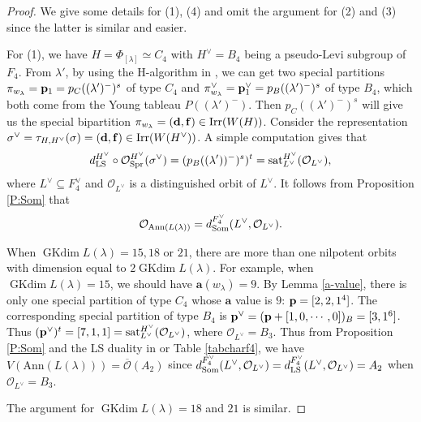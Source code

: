 \documentclass[reqno,12pt]{amsart}
\numberwithin{equation}{section}
\theoremstyle{plain}
\theoremstyle{definition}
\newcommand{\lam}{\lambda}
\newcommand{\Ann}{\mathrm{Ann}}
\renewcommand{\subset}{\subseteq}
\newcommand{\aff}{ \mathbf{a} }
\newcommand{\gkd}{\operatorname{GKdim}}
\begin{document}
\begin{proof}
We give some details for (1), (4) and omit the argument for  (2) and (3) since the latter is similar and easier.

For (1), we have
$H=\Phi_{[\lambda]}\simeq C_4$ with $H^\vee=B_4$ being a pseudo-Levi subgroup of $F_4$. From $\lam'$, by using the H-algorithm in \cite{BMW}, we can get two special partitions $\pi_{w_{\lam}}={\bf p}_{1}=p_C((\lam')^-)^s$ of type $C_4$ and  $\pi^{\vee}_{w_{\lam}}={\bf p}^{\vee}_{1}=p_B((\lam')^-)^s$ of type $B_4$, which both come from the Young tableau $P((\lam')^-)$. Then $p_C((\lam')^-)^s$ will give us the special bipartition $\pi_{w_\lambda} = ({\bf d}, {\bf f})   \in {\rm Irr}(W(H))$. 
Consider the representation $\sigma^\vee= \tau_{H, H^\vee}(\sigma) = ({\bf d}, {\bf f}) \in {\rm Irr}(W(H^\vee))$. A simple computation gives that
$$d_{\rm LS}^{H^\vee} \circ \mathcal{O}_{\rm Spr}^{H^\vee}(\sigma^\vee) = (p_B((\lam'))^-)^s)^t = {\rm sat}_{L^\vee}^{H^\vee} (\mathcal{O}_{L^\vee}),$$
where $L^\vee \subset F_4^\vee$ and $\mathcal{O}_{L^\vee}$ is a distinguished orbit of $L^\vee$.
It follows from Proposition \ref{P:Som} that $$\mathcal{O}_{{\rm Ann}(L(\lambda))} = d_{\rm Som}^{F_4^\vee}(L^{\vee}, \mathcal{O}_{L^\vee}).$$


  When $ \gkd L(\lam)=15, 18 $ or $21$,  there are more than one nilpotent orbits with
dimension equal to $2 \gkd L(\lam)$.
For example, when $ \gkd L(\lam)=15$, we should have $\aff(w_{\lam})=9$. By Lemma \ref{a-value}, there is only one special partition of type $C_4$ whose $\aff$ value is $9$: ${\bf p}=[2,2,1^4]$.
  The corresponding special partition of type $B_4$ is ${\bf p}^{\vee}=({\bf p}+[1,0,\cdots,0])_B=[3,1^6]$. Thus $({\bf p}^{\vee})^t=[7,1,1]={\rm sat}_{L^\vee}^{H^\vee} (\mathcal{O}_{L^\vee})$, where $\mathcal{O}_{L^\vee}=B_3$.  
  Thus from Proposition \ref{P:Som} and the LS duality in \cite[p. 440]{Ca85} or Table \ref{tabcharf4}, we have $V(\Ann (L(\lam)))=\overline{\mathcal{O}}(A_2)$ since $ d_{\rm Som}^{F_4^\vee}(L^{\vee}, \mathcal{O}_{L^\vee})=d_{\rm LS}^{F_4^\vee}(L^{\vee}, \mathcal{O}_{L^\vee})=A_2$ when $\mathcal{O}_{L^\vee}=B_3$.

The  argument for $\gkd L(\lam)=18$ and $21$ is similar. 




\end{proof}
\end{document}
